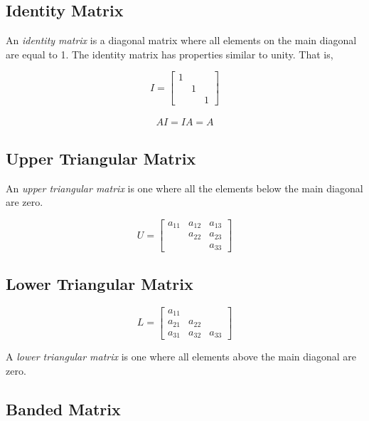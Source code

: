 \documentclass[book.tex]{subfiles}
\begin{document}
\subsection{Identity Matrix}
An \textit{identity matrix} is a diagonal matrix where all elements on the main diagonal are equal to 1. The identity matrix has properties similar to unity. That is,
\begin{margintable}
	\[
	I=
	\begin{bmatrix}
	1 &  &  \\
	& 1 &  \\
	&  & 1
	\end{bmatrix}
	\]
\end{margintable}
\vspace{-20pt}
\begin{align}
AI = IA = A
\end{align}

\subsection{Upper Triangular Matrix}
An \textit{upper triangular matrix} is one where all the elements below the main diagonal are zero.
\begin{margintable}
	\[
	U=
	\begin{bmatrix}
	a_{11} & a_{12} & a_{13} \\
	& a_{22} & a_{23} \\
	&  & a_{33}
	\end{bmatrix}
	\]
\end{margintable}
\vspace{-8pt}

\subsection{Lower Triangular Matrix}
\vspace{-6pt}
\begin{margintable}
	\[
	L=
	\begin{bmatrix}
	a_{11} &  &  \\
	a_{21} & a_{22} &  \\
	a_{31} & a_{32} & a_{33}
	\end{bmatrix}
	\]
\end{margintable}
A \textit{lower triangular matrix} is one where all elements above the main diagonal are zero.

\subsection{Banded Matrix}
\end{document}
